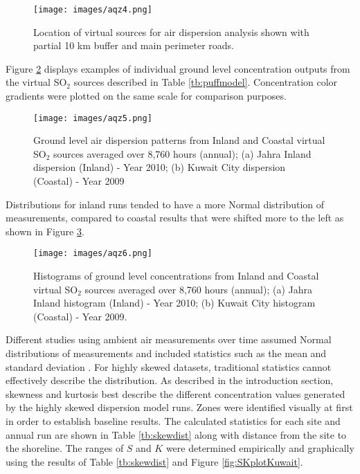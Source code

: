 %
%
\begin{figure}[H]
\centering
\texttt{[image: images/aqz4.png]} 
\caption[Location of virtual sources]{Location of virtual sources for air dispersion analysis shown with partial 10 km buffer and main perimeter roads.}
\label{fig:virtual-locations}
\end{figure}
%

Figure \ref{fig:virtual-dispersions} displays examples of individual ground level concentration outputs from the virtual SO$_{2}$ sources described in Table \ref{tb:puffmodel}. Concentration color gradients were plotted on the same scale for comparison purposes.  
%
\begin{figure}[H]
\centering
\texttt{[image: images/aqz5.png]} 
\caption[Ground level air dispersion patterns]{Ground level air dispersion patterns from Inland and Coastal virtual SO$_{2}$ sources averaged over 8,760 hours (annual); (a) Jahra Inland dispersion (Inland) - Year 2010; (b) Kuwait City dispersion (Coastal) - Year 2009}
\label{fig:virtual-dispersions}
\end{figure}
%
Distributions for inland runs tended to have a more Normal distribution of measurements, compared to coastal results that were shifted more to the left as shown in Figure \ref{fig:virtual-histogram}.
%
\begin{figure}[H]
\centering
\texttt{[image: images/aqz6.png]} 
\caption[Histograms of ground level concentrations]{Histograms of ground level concentrations from Inland and Coastal virtual SO$_{2}$ sources averaged over 8,760 hours (annual); (a) Jahra Inland histogram (Inland) - Year 2010; (b) Kuwait City histogram (Coastal) - Year 2009.}
\label{fig:virtual-histogram}
\end{figure}
%

Different studies using ambient air measurements over time assumed Normal distributions of measurements and included statistics such as the mean and standard deviation \citep{Henschel2013, Rivera2015, Suresh2005}.  For highly skewed datasets, traditional statistics cannot effectively describe the distribution.  As described in the introduction section, skewness and kurtosis best describe the different concentration values generated by the highly skewed dispersion model runs.  Zones were identified visually at first in order to establish baseline results.  The calculated statistics for each site and annual run are shown in Table \ref{tb:skewdist} along with distance from the site to the shoreline.  The ranges of $S$ and $K$ were determined empirically and graphically using the results of Table \ref{tb:skewdist} and Figure  \ref{fig:SKplotKuwait}.

